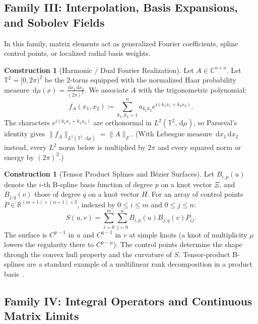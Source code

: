 \documentclass[11pt,a4paper,reqno]{amsart}
\theoremstyle{definition}
\newtheorem{construction}[theorem]{Construction}
\numberwithin{equation}{section}
\newcommand{\R}{\mathbb{R}}
\newcommand{\C}{\mathbb{C}}
\newcommand{\Tor}{\mathbb{T}}
\newcommand{\dif}{\,\mathrm{d}}
\begin{document}
\subsection{Family III: Interpolation, Basis Expansions, and Sobolev Fields}
\label{subsec:fam3}

In this family, matrix elements act as generalized Fourier coefficients, spline control points, or localized radial basis weights.

\begin{construction}[Harmonic / Dual Fourier Realization]
\label{constr:harmonic}
Let $A \in \C^{n \times n}$. Let $\Tor^2 = [0, 2\pi)^2$ be the 2-torus equipped with the normalized Haar probability measure $\dif\mu(x) = \frac{\dif x_1 \dif x_2}{(2\pi)^2}$. We associate $A$ with the trigonometric polynomial:
\begin{equation}
    \label{eq:fourier_realization}
    f_A(x_1, x_2) \coloneqq \sum_{k_1, k_2 = 1}^n a_{k_1 k_2} e^{i (k_1 x_1 + k_2 x_2)}.
\end{equation}
The characters $e^{i(k_1 x_1 + k_2 x_2)}$ are orthonormal in $L^2(\Tor^2, \dif\mu)$, so Parseval's identity gives $\|f_A\|_{L^2(\Tor^2, \dif\mu)} = \|A\|_F$. (With Lebesgue measure $\dif x_1 \dif x_2$ instead, every $L^2$ norm below is multiplied by $2\pi$ and every squared norm or energy by $(2\pi)^2$.)
\end{construction}

\begin{construction}[Tensor Product Splines and B\'ezier Surfaces]
Let $B_{i, p}(u)$ denote the $i$-th B-spline basis function of degree $p$ on a knot vector $\Xi$, and $B_{j,q}(v)$ those of degree $q$ on a knot vector $H$. For an array of control points $P \in \R^{(m+1) \times (n+1) \times 3}$, indexed by $0 \le i \le m$ and $0 \le j \le n$:
\begin{equation}
    S(u, v) = \sum_{i=0}^m \sum_{j=0}^n B_{i, p}(u) B_{j, q}(v) P_{ij}.
\end{equation}
The surface is $C^{p-1}$ in $u$ and $C^{q-1}$ in $v$ at simple knots (a knot of multiplicity $\mu$ lowers the regularity there to $C^{p-\mu}$). The control points determine the shape through the convex hull property and the curvature of $S$. Tensor-product B-splines are a standard example of a multilinear rank decomposition in a product basis~\cite[\S4]{lim2021tensors}.
\end{construction}

\subsection{Family IV: Integral Operators and Continuous Matrix Limits}
\label{subsec:fam4}
\end{document}

